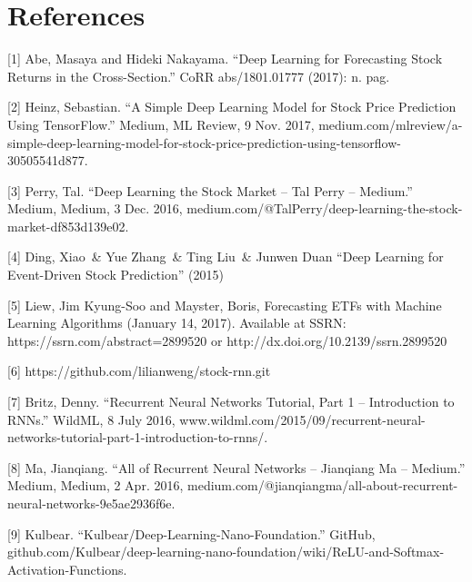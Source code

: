 \documentclass{article}
\begin{document}
\section*{References}
\medskip

\small

[1] Abe, Masaya and Hideki Nakayama. “Deep Learning for Forecasting Stock Returns in the Cross-Section.” CoRR abs/1801.01777 (2017): n. pag.

[2] Heinz, Sebastian. “A Simple Deep Learning Model for Stock Price Prediction Using TensorFlow.” Medium, ML Review, 9 Nov. 2017, medium.com/mlreview/a-simple-deep-learning-model-for-stock-price-prediction-using-tensorflow-30505541d877.

[3] Perry, Tal. “Deep Learning the Stock Market – Tal Perry – Medium.” Medium, Medium, 3 Dec. 2016, medium.com/@TalPerry/deep-learning-the-stock-market-df853d139e02.

[4] Ding, Xiao\ \& Yue Zhang\ \& Ting Liu\ \& Junwen Duan “Deep Learning for Event-Driven Stock Prediction” (2015)

[5] Liew, Jim Kyung-Soo and Mayster, Boris, Forecasting ETFs with Machine Learning Algorithms (January 14, 2017). Available at SSRN: https://ssrn.com/abstract=2899520 or http://dx.doi.org/10.2139/ssrn.2899520

[6] https://github.com/lilianweng/stock-rnn.git

[7] Britz, Denny. “Recurrent Neural Networks Tutorial, Part 1 – Introduction to RNNs.” WildML, 8 July 2016, www.wildml.com/2015/09/recurrent-neural-networks-tutorial-part-1-introduction-to-rnns/.

[8] Ma, Jianqiang. “All of Recurrent Neural Networks – Jianqiang Ma – Medium.” Medium, Medium, 2 Apr. 2016, medium.com/@jianqiangma/all-about-recurrent-neural-networks-9e5ae2936f6e.

[9] Kulbear. “Kulbear/Deep-Learning-Nano-Foundation.” GitHub, github.com/Kulbear/deep-learning-nano-foundation/wiki/ReLU-and-Softmax-Activation-Functions.
\end{document}
